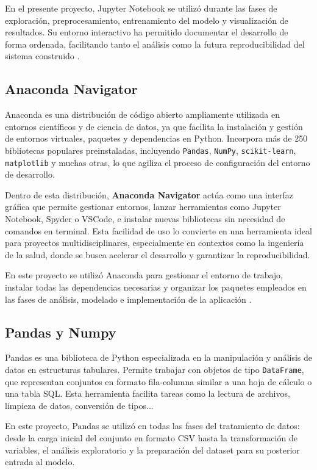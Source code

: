 En el presente proyecto, Jupyter Notebook se utilizó durante las fases de exploración, preprocesamiento, entrenamiento del modelo y visualización de resultados. Su entorno interactivo ha permitido documentar el desarrollo de forma ordenada, facilitando tanto el análisis como la futura reproducibilidad del sistema construido \cite{jupyter2024}.


\subsection{Anaconda Navigator}

Anaconda es una distribución de código abierto ampliamente utilizada en entornos científicos y de ciencia de datos, ya que facilita la instalación y gestión de entornos virtuales, paquetes y dependencias en Python. Incorpora más de 250 bibliotecas populares preinstaladas, incluyendo \texttt{Pandas}, \texttt{NumPy}, \texttt{scikit-learn}, \texttt{matplotlib} y muchas otras, lo que agiliza el proceso de configuración del entorno de desarrollo.

Dentro de esta distribución, \textbf{Anaconda Navigator} actúa como una interfaz gráfica que permite gestionar entornos, lanzar herramientas como Jupyter Notebook, Spyder o VSCode, e instalar nuevas bibliotecas sin necesidad de comandos en terminal. Esta facilidad de uso lo convierte en una herramienta ideal para proyectos multidisciplinares, especialmente en contextos como la ingeniería de la salud, donde se busca acelerar el desarrollo y garantizar la reproducibilidad.

En este proyecto se utilizó Anaconda para gestionar el entorno de trabajo, instalar todas las dependencias necesarias y organizar los paquetes empleados en las fases de análisis, modelado e implementación de la aplicación \cite{anaconda2024}.


\subsection{Pandas y Numpy}
Pandas es una biblioteca de Python especializada en la manipulación y análisis de datos en estructuras tabulares. Permite trabajar con objetos de tipo \texttt{DataFrame}, que representan conjuntos en formato fila-columna similar a una hoja de cálculo o una tabla SQL. Esta herramienta facilita tareas como la lectura de archivos, limpieza de datos, conversión de tipos...

En este proyecto, Pandas se utilizó en todas las fases del tratamiento de datos: desde la carga inicial del conjunto en formato CSV hasta la transformación de variables, el análisis exploratorio y la preparación del dataset para su posterior entrada al modelo.

